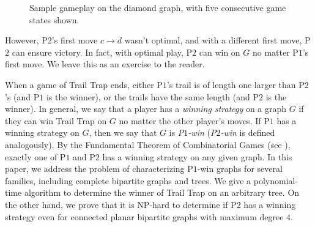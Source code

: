 \documentclass{article}
\theoremstyle{plain}
\theoremstyle{definition}
\def\pone{{\rm{P}\ensuremath{1}}}
\def\ptwo{{\rm{P}\ensuremath{2}}}
\def\poneposs{{\rm{P}\ensuremath{1}'s}}
\def\ptwoposs{{\rm{P}\ensuremath{2}'s}}
\begin{document}
\begin{figure}[ht]
    \caption{Sample gameplay on the diamond graph, with five consecutive game states shown.}
    \label{fig:example_game_diamond}
\end{figure}

However, \ptwoposs{} first move $c \to d$ wasn't optimal, and with a different first move, \ptwo{} can ensure victory. In fact, with optimal play, \ptwo{} can win on $G$ no matter \poneposs{} first move. We leave this as an exercise to the reader. 



When a game of {\sc Trail Trap} ends, either \poneposs{} trail is of length one larger than \ptwoposs{} (and \pone{} is the winner), or the trails have the same length (and \ptwo{} is the winner).
In general, we say that a player has a \emph{winning strategy} on a graph $G$ if they can win {\sc Trail Trap} on $G$ no matter the other player's moves. If \pone{} has a winning strategy on $G$, then we say that $G$ is \emph{\pone{}-win} (\emph{\ptwo{}-win} is defined analogously). By the Fundamental Theorem of Combinatorial Games (see \cite{AlNoWo19}), exactly one of \pone{} and \ptwo{} has a winning strategy on any given graph. In this paper, we address the problem of characterizing \pone{}-win graphs for several families, including complete bipartite graphs and trees. We give a polynomial-time algorithm to determine the winner of {\sc Trail Trap} on an arbitrary tree. On the other hand, we prove that it is NP-hard to determine if \ptwo{} has a winning strategy even for connected planar bipartite graphs with maximum degree $4$. 
\end{document}
